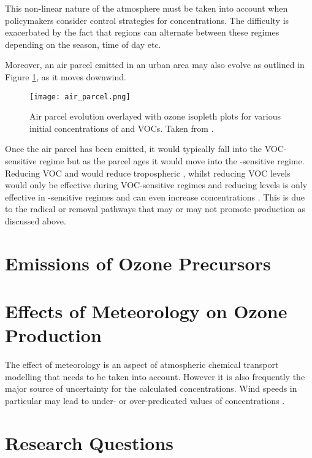 This non-linear nature of the atmosphere must be taken into account when policymakers consider control strategies for  concentrations. 
The difficulty is exacerbated by the fact that regions can alternate between these regimes depending on the season, time of day etc. 

Moreover, an air parcel emitted in an urban area may also evolve as outlined in Figure \ref{f:air_parcel}, as it moves downwind. 
\begin{figure}
	\begin{center}
		\texttt{[image: air\_parcel.png]}
		\caption{Air parcel evolution overlayed with ozone isopleth plots for various initial concentrations of  and VOCs. Taken from \citep{Sillman:1999}.}
		\label{f:air_parcel}
	\end{center}
\end{figure}
Once the air parcel has been emitted, it would typically fall into the VOC-sensitive regime but as the parcel ages it would move into the -sensitive regime. 
Reducing VOC and  would reduce tropospheric , whilst reducing VOC levels would only be effective during VOC-sensitive regimes and reducing  levels is only effective in -sensitive regimes and can even increase  concentrations \citep{Sillman:1999}. 
This is due to the radical or  removal pathways that may or may not promote  production as discussed above.

\section{Emissions of Ozone Precursors} \label{s:precursor_emissions}

\section{Effects of Meteorology on Ozone Production} \label{s:meteo_ozone}

The effect of meteorology is an aspect of atmospheric chemical transport modelling that needs to be taken into account. 
However it is also frequently the major source of uncertainty for the calculated  concentrations. 
Wind speeds in particular may lead to under- or over-predicated values of  concentrations \citep{Sillman:1999}. 

\section{Research Questions} \label{s:research_questions}

